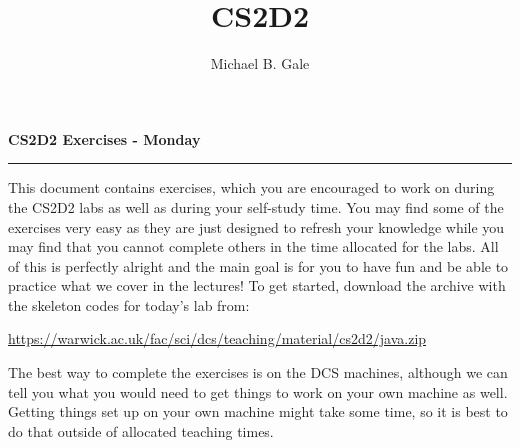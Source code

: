 \documentclass[]{uow-exercises}
\author{Michael B. Gale}
\title{CS2D2}
\begin{document}
\pagestyle{fancy}
\thispagestyle{fancy}

\begin{center}
    \textbf{\LARGE CS2D2 Exercises - Monday}
\end{center} \hrule \vspace{0.5cm}

This document contains exercises, which you are encouraged to work on during the CS2D2 labs as well as during your self-study time. You may find some of the exercises very easy as they are just designed to refresh your knowledge while you may find that you cannot complete others in the time allocated for the labs. All of this is perfectly alright and the main goal is for you to have fun and be able to practice what we cover in the lectures!
To get started, download the archive with the skeleton codes for today’s lab from:
\begin{center}\small
    \url{https://warwick.ac.uk/fac/sci/dcs/teaching/material/cs2d2/java.zip}
\end{center}

The best way to complete the exercises is on the DCS machines, although we can tell you what you would need to get things to work on your own machine as well. Getting things set up on your own machine might take some time, so it is best to do that outside of allocated teaching times.


	
\end{document}
